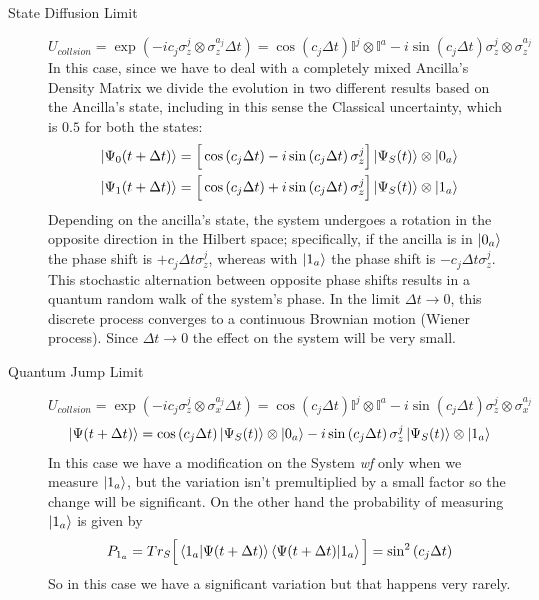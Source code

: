 \documentclass[a4paper,12pt]{article}
\begin{document}
	\begin{description}
		\item[State Diffusion Limit]
		\begin{equation}
			U_{collsion} = \exp \left(-i c_j \sigma_{z}^{j} \otimes \sigma_{z}^{a_j} \Delta t\right) = \cos \left(c_j \Delta t \right) \mathbb{I}^j \otimes \mathbb{I}^a - i \sin \left(c_j \Delta t \right) \sigma_{z}^{j} \otimes \sigma_{z}^{a_j}
			\label{eq:U_coll_Diff}
		\end{equation}
		In this case, since we have to deal with a completely mixed Ancilla's Density Matrix we divide the evolution in two different results based on the Ancilla's state, including in this sense the Classical uncertainty, which is $0.5$ for both the states:
		\begin{align}
			\ket{\Psi_0 (t + \Delta t) } = \Big[ \cos \left(c_j \Delta t \right) - i \sin \left(c_j \Delta t \right) \sigma_{z}^{j} \Big] \ket{\Psi_S(t)} \otimes \ket{0_a}
			\label{eq:psi_evol_Diff0} \\
			\ket{\Psi_1 (t + \Delta t) } = \Big[ \cos \left(c_j \Delta t \right) + i \sin \left(c_j \Delta t \right) \sigma_{z}^{j} \Big] \ket{\Psi_S(t)} \otimes \ket{1_a}
			\label{eq:psi_evol_Diff1}
		\end{align}
		Depending on the ancilla's state, the system undergoes a rotation in the opposite direction in the Hilbert space; specifically, if the ancilla is in $ \ket{0_a} $ the phase shift is $ + c_j \Delta t \sigma_{z}^{j} $, whereas with $ \ket{1_a} $ the phase shift is $ - c_j \Delta t \sigma_{z}^{j} $. This stochastic alternation between opposite phase shifts results in a quantum random walk of the system's phase. In the limit $ \Delta t \rightarrow 0 $, this discrete process converges to a continuous Brownian motion (Wiener process). Since $ \Delta t \rightarrow 0 $ the effect on the system will be very small.
		\item[Quantum Jump Limit]
		\begin{equation}
			U_{collsion} = \exp \left(-i c_j \sigma_{z}^{j} \otimes \sigma_{x}^{a_j} \Delta t\right) = \cos \left(c_j \Delta t \right) \mathbb{I}^j \otimes \mathbb{I}^a - i \sin \left(c_j \Delta t \right) \sigma_{z}^{j} \otimes \sigma_{x}^{a_j}
			\label{eq:U_coll_QJ}
		\end{equation}
		\begin{equation}
			\ket{\Psi (t + \Delta t) } = \cos \left(c_j \Delta t \right) \ket{\Psi_S (t)} \otimes \ket{0_a} - i \sin \left(c_j \Delta t \right) \sigma_{z}^{j} \ket{\Psi_S(t)} \otimes \ket{1_a}
			\label{eq:psi_evol_QJ}
		\end{equation}
		In this case we have a modification on the System \textit{wf} only when we measure $ \ket{1_a} $, but the variation isn't premultiplied by a small factor so the change will be significant. On the other hand the probability of measuring $ \ket{1_a} $ is given by
		\begin{equation}
			P_{1_a} = Tr_S \Big[\braket{1_a | \Psi(t + \Delta t)}\braket{\Psi(t + \Delta t) | 1_a}\Big] = \sin^{2}{\left(c_j \Delta t\right)}
			\label{eq:ancilla_probability}
		\end{equation}
		So in this case we have a significant variation but that happens very rarely.
	\end{description}
\end{document}

